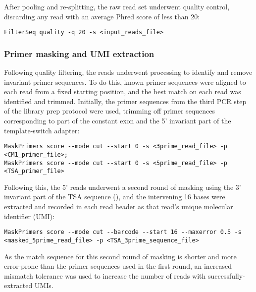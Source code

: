 After pooling and re-splitting, the raw read set underwent quality control, discarding any read with an average Phred score of less than 20:

\begin{lstlisting}
FilterSeq quality -q 20 -s <input_reads_file>
\end{lstlisting}

\subsubsection{Primer masking and UMI extraction}
\label{sec:methods_comp_igpreproc_mask}


Following quality filtering, the reads underwent processing to identify and remove invariant primer sequences. To do this, known primer sequences were aligned to each read from a fixed starting position, and the best match on each read was identified and trimmed. Initially, the primer sequences from the third PCR step of the library prep protocol were used, trimming off primer sequences corresponding to part of the constant  exon and the 5' invariant part of the template-switch adapter:

\begin{lstlisting}
MaskPrimers score --mode cut --start 0 -s <3prime_read_file> -p <CM1_primer_file>;
MaskPrimers score --mode cut --start 0 -s <5prime_read_file> -p <TSA_primer_file>
\end{lstlisting}

Following this, the 5' reads underwent a second round of masking using the 3' invariant part of the TSA sequence (), and the intervening 16 bases were extracted and recorded in each read header as that read's unique molecular identifier (UMI):

\begin{lstlisting}
MaskPrimers score --mode cut --barcode --start 16 --maxerror 0.5 -s <masked_5prime_read_file> -p <TSA_3prime_sequence_file>
\end{lstlisting}

As the match sequence for this second round of masking is shorter and more error-prone than the primer sequences used in the first round, an increased mismatch tolerance was used to increase the number of reads with successfully-extracted UMIs.

